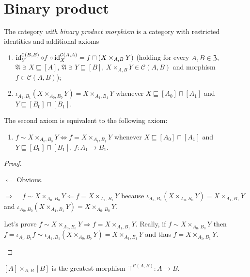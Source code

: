 \section{Binary product}

\begin{defn}
The category \emph{with binary product morphism}
is a category with restricted identities and additional axioms
\begin{enumerate}
\item\label{binprod-cmp} $\operatorname{id}^{\mathcal{C}(B,B)}_Y\circ f\circ\operatorname{id}^{\mathcal{C}(A,A)}_X=f\sqcap(X\times_{A,B}Y)$
(holding for every $A,B\in\mathfrak{Z}$,
$\mathfrak{A}\ni X\sqsubseteq[A]$,
$\mathfrak{A}\ni Y\sqsubseteq[B]$,
$X\times_{A,B}Y\in\mathcal{C}(A,B)$
and morphism~$f\in\mathcal{C}(A,B)$);
\item\label{binprod-mv} $\iota_{A_1,B_1}(X\times_{A_0,B_0}Y)=
X\times_{A_1,B_1}Y$ whenever
$X\sqsubseteq[A_0]\sqcap[A_1]$ and $Y\sqsubseteq[B_0]\sqcap[B_1]$.
\end{enumerate}
\end{defn}

\begin{prop}
The second axiom is equivalent to the following axiom:
\begin{enumerate}
\item
$f \sim X \times_{A_0, B_0} Y \Leftrightarrow f =
X \times_{A_1, B_1} Y$
whenever
$X\sqsubseteq[A_0]\sqcap[A_1]$ and $Y\sqsubseteq[B_0]\sqcap[B_1]$, $f:A_1\to B_1$.
\end{enumerate}
\end{prop}

\begin{proof}
~
\begin{widedisorder}
\item[$\Leftarrow$] Obvious.

\item[$\Rightarrow$]~
$f \sim X \times_{A_0, B_0} Y \Leftarrow f =
X \times_{A_1, B_1} Y$ because
$\iota_{A_1,B_1}(X\times_{A_0,B_0}Y)=
X\times_{A_1,B_1}Y$ and
$\iota_{A_0,B_0}(X\times_{A_1,B_1}Y)=
X\times_{A_0,B_0}Y$.

Let's prove
$f \sim X \times_{A_0, B_0} Y \Rightarrow f =
X \times_{A_1, B_1} Y$.
Really, if $f \sim X \times_{A_0, B_0} Y$ then
$f = \iota_{A_1,B_1}f \sim \iota_{A_1,B_1}(X \times_{A_0, B_0} Y)=X \times_{A_1, B_1} Y$ and thus 
$f=X \times_{A_1, B_1} Y$.
\end{widedisorder}
\end{proof}

\begin{prop}
$[A]\times_{A,B}[B]$ is the greatest morphism
$\top^{\mathcal{C}(A,B)}:A\to B$.
\end{prop}

